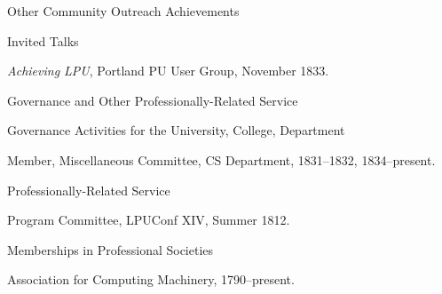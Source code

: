 \documentclass{psu-vita}
\begin{document}
%
\begin{majorhead}{Other Community Outreach Achievements}
  \begin{minorhead}{Invited Talks}
  \item {\em Achieving LPU},
    Portland PU User Group, November 1833.
  \end{minorhead}
\end{majorhead}
%
%
%
%
\begin{majorhead}{Governance and Other Professionally-Related Service}
  \begin{minorhead}{Governance Activities for the University,
                     College, Department}
    \item Member, Miscellaneous Committee, CS Department,
      1831--1832, 1834--present.
  \end{minorhead}
%
  \begin{minorhead}{Professionally-Related Service}
    \item Program Committee, LPUConf XIV, Summer 1812.
  \end{minorhead}
\end{majorhead}
%
\begin{majorhead}{Memberships in Professional Societies}
  \item Association for Computing Machinery, 1790--present.
\end{majorhead}
%

\end{document}
